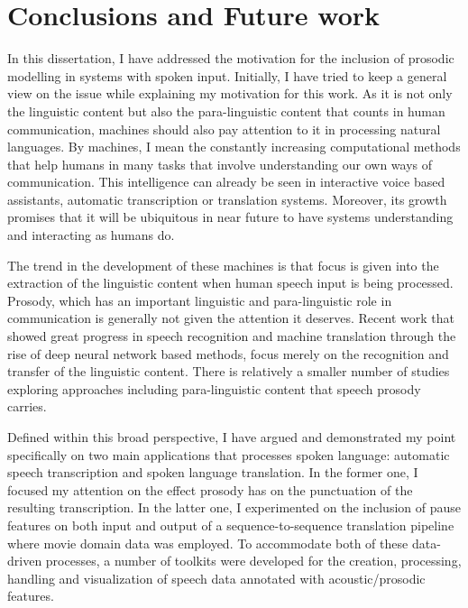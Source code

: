 
\chapter{Conclusions and Future work}
\label{chapter:conclusion}

In this dissertation, I have addressed the motivation for the inclusion of prosodic modelling in systems with spoken input. Initially, I have tried to keep a general view on the issue while explaining my motivation for this work. As it is not only the linguistic content but also the para-linguistic content that counts in human communication, machines should also pay attention to it in processing natural languages. By machines, I mean the constantly increasing computational methods that help humans in many tasks that involve understanding our own ways of communication. This intelligence can already be seen in interactive voice based assistants, automatic transcription or translation systems. Moreover, its growth promises that it will be ubiquitous in near future to have systems understanding and interacting as humans do. 

The trend in the development of these machines is that focus is given into the extraction of the linguistic content when human speech input is being processed. Prosody, which has an important linguistic and para-linguistic role in communication is generally not given the attention it deserves. Recent work that showed great progress in speech recognition and machine translation through the rise of deep neural network based methods, focus merely on the recognition and transfer of the linguistic content. There is relatively a smaller number of studies exploring approaches including para-linguistic content that speech prosody carries.

Defined within this broad perspective, I have argued and demonstrated my point specifically on two main applications that processes spoken language: automatic speech transcription and spoken language translation. In the former one, I focused my attention on the effect prosody has on the punctuation of the resulting transcription. In the latter one, I experimented on the inclusion of pause features on both input and output of a sequence-to-sequence translation pipeline where movie domain data was employed. To accommodate both of these data-driven processes, a number of toolkits were developed for the creation, processing, handling and visualization of speech data annotated with acoustic/prosodic features. 


